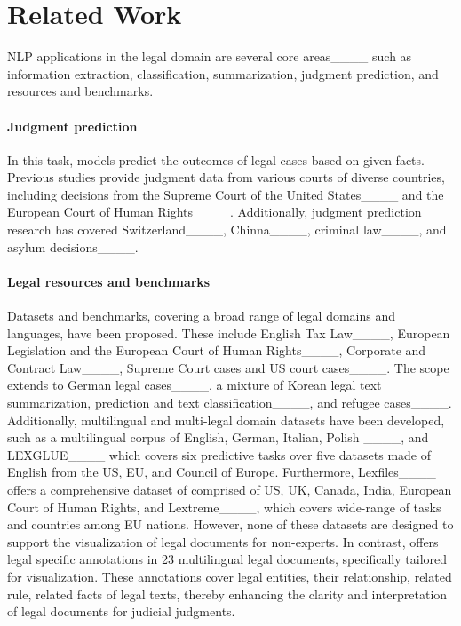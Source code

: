 \section{Related Work}
NLP applications in the legal domain are several core areas____ such as information extraction, classification, summarization, judgment prediction, and resources and benchmarks.

\paragraph{Judgment prediction}
In this task, models predict the outcomes of legal cases based on given facts.
Previous studies provide judgment data from various courts of diverse countries, including decisions from the Supreme Court of the United States____ and the European Court of Human Rights____.
Additionally, judgment prediction research has covered Switzerland____, Chinna____, criminal law____, and asylum decisions____.

\paragraph{Legal resources and benchmarks} 
Datasets and benchmarks, covering a broad range of legal domains and languages, have been proposed.
These include English Tax Law____, European Legislation and the European Court of Human Rights____, Corporate and Contract Law____, Supreme Court cases and US court cases____.
The scope extends to German legal cases____, a mixture of Korean legal text summarization, prediction and text classification____, and refugee cases____. 
Additionally, multilingual and multi-legal domain datasets have been developed, such as a multilingual corpus of English, German, Italian, Polish ____,
and LEXGLUE____ which covers six predictive tasks over five datasets made of English from the US, EU, and Council of Europe.
Furthermore, Lexfiles____ offers a comprehensive dataset of comprised of US, UK, Canada, India, European Court of Human Rights, and Lextreme____, which covers wide-range of tasks and countries among EU nations.
However, none of these datasets are designed to support the visualization of legal documents for non-experts.
In contrast, \datasetName offers legal specific annotations in 23 multilingual legal documents, specifically tailored for visualization.
These annotations cover legal entities, their relationship, related rule, related facts of legal texts, thereby enhancing the clarity and interpretation of legal documents for judicial judgments.

